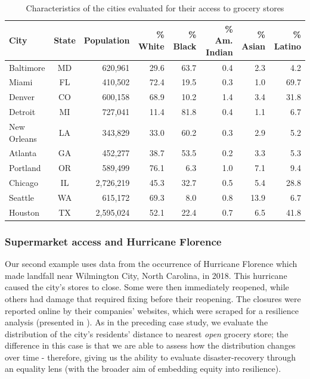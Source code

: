 \documentclass[final,3p,times,onecolumn,sort&compress]{elsarticle}
\begin{document}
\begin{table}[h]
\caption{Characteristics of the cities evaluated for their access to grocery stores}
\label{tab:city_dem}
\centering
\begin{tabular}{l c r r r r r r} 
    \hline
    City & State & Population & \% White & \% Black & \% Am. Indian & \% Asian & \% Latino \\
    \hline
    Baltimore   & MD & 620,961  & 29.6 & 63.7 & 0.4 & 2.3  & 4.2  \\
    Miami       & FL & 410,502  & 72.4 & 19.5 & 0.3 & 1.0  & 69.7 \\
    Denver      & CO & 600,158  & 68.9 & 10.2 & 1.4 & 3.4  & 31.8 \\
    Detroit     & MI & 727,041  & 11.4 & 81.8 & 0.4 & 1.1  & 6.7  \\
    New Orleans & LA & 343,829  & 33.0 & 60.2 & 0.3 & 2.9  & 5.2  \\
    Atlanta     & GA & 452,277  & 38.7 & 53.5 & 0.2 & 3.3  & 5.3  \\
    Portland    & OR & 589,499  & 76.1 & 6.3  & 1.0 & 7.1  & 9.4  \\
    Chicago     & IL & 2,726,219 & 45.3 & 32.7 & 0.5 & 5.4  & 28.8 \\
    Seattle     & WA & 615,172  & 69.3 & 8.0  & 0.8 & 13.9 & 6.7  \\
    Houston     & TX & 2,595,024 & 52.1 & 22.4 & 0.7 & 6.5  & 41.8 \\
    \hline
\end{tabular}
\end{table}

\subsubsection{Supermarket access and Hurricane Florence}
Our second example uses data from the occurrence of Hurricane Florence which made landfall near Wilmington City, North Carolina, in 2018. 
This hurricane caused the city's stores to close.
Some were then immediately reopened, while others had damage that required fixing before their reopening.
The closures were reported online by their companies' websites, which were scraped for a resilience analysis (presented in \cite{Logan2020-vj}).
As in the preceding case study, we evaluate the distribution of the city's residents' distance to nearest \textit{open} grocery store;
the difference in this case is that we are able to assess how the distribution changes over time - therefore, giving us the ability to evaluate disaster-recovery through an equality lens (with the broader aim of embedding equity into resilience).
\end{document}
